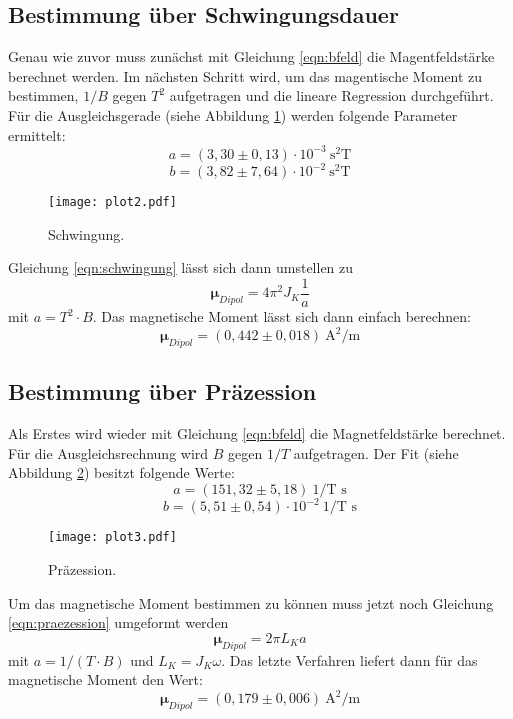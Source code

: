 \subsection{Bestimmung über Schwingungsdauer}

Genau wie zuvor muss zunächst mit Gleichung \eqref{eqn:bfeld} die Magentfeldstärke berechnet werden.
Im nächsten Schritt wird, um das magentische Moment zu bestimmen, $1/B$ gegen $T^{2}$ aufgetragen und die lineare Regression durchgeführt.
Für die Ausgleichsgerade (siehe Abbildung \ref{fig:plot2}) werden folgende Parameter ermittelt:
\begin{equation*}
  a = (3,30 \pm 0,13) \cdot 10^{-3} \: \text{s}^{2} \text{T}
\end{equation*}
\begin{equation*}
  b = (3,82 \pm 7,64) \cdot 10^{-2} \: \text{s}^{2} \text{T}
\end{equation*}
\begin{figure}
  \centering
  \texttt{[image: plot2.pdf]}
  \caption{Schwingung.}
  \label{fig:plot2}
\end{figure}
Gleichung \eqref{eqn:schwingung} lässt sich dann umstellen zu
\begin{equation}
  \symbf{\mu}_{Dipol} = 4 \pi^2 J_K \frac{1}{a}
\end{equation}
mit $a = T^{2} \cdot B$.
Das magnetische Moment lässt sich dann einfach berechnen:
\begin{equation*}
  \symbf{\mu}_{Dipol} = (0,442 \pm 0,018) \: \text{A}^{2}/\text{m}
\end{equation*}

\subsection{Bestimmung über Präzession}

Als Erstes wird wieder mit Gleichung \eqref{eqn:bfeld} die Magnetfeldstärke berechnet.
Für die Ausgleichsrechnung wird $B$ gegen $1/T$ aufgetragen.
Der Fit (siehe Abbildung \ref{fig:plot3}) besitzt folgende Werte:
\begin{equation*}
  a = (151,32 \pm 5,18) \: 1/\text{T s}
\end{equation*}
\begin{equation*}
  b = (5,51 \pm 0,54) \cdot 10^{-2} \: 1/\text{T s}
\end{equation*}
\begin{figure}
  \centering
  \texttt{[image: plot3.pdf]}
  \caption{Präzession.}
  \label{fig:plot3}
\end{figure}
Um das magnetische Moment bestimmen zu können muss jetzt noch Gleichung \eqref{eqn:praezession} umgeformt werden
\begin{equation}
  \symbf{\mu}_{Dipol} = 2 \pi L_K a
\end{equation}
mit $a = 1/(T \cdot B)$ und $L_K = J_K \omega$.
Das letzte Verfahren liefert dann für das magnetische Moment den Wert:
\begin{equation*}
  \symbf{\mu}_{Dipol} = (0,179 \pm 0,006) \: \text{A}^{2}/\text{m}
\end{equation*}
